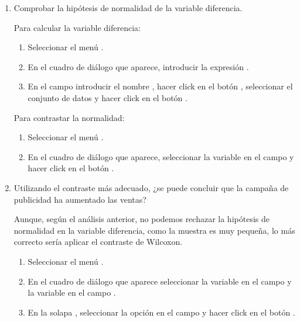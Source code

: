 \begin{enumerate}[leftmargin=*]
\begin{enumerate}
\item Comprobar la hipótesis de normalidad de la variable diferencia.
\begin{indicacion}
Para calcular la variable diferencia:
\begin{enumerate}
\item Seleccionar el menú .
\item En el cuadro de diálogo que aparece, introducir la expresión .
\item En el campo  introducir el nombre , hacer click en el botón
, seleccionar el conjunto de datos  y hacer click en el botón .
\end{enumerate}
Para contrastar la normalidad:
\begin{enumerate}
\item Seleccionar el menú .
\item En el cuadro de diálogo que aparece, seleccionar la variable  en el campo  y
hacer click en el botón .
\end{enumerate}
\end{indicacion}

\item Utilizando el contraste más adecuado, ¿se puede concluir que la campaña de publicidad ha aumentado las ventas?
\begin{indicacion}
Aunque, según el análisis anterior, no podemos rechazar la hipótesis de normalidad en la variable diferencia, como la
muestra es muy pequeña, lo más correcto sería aplicar el contraste de Wilcoxon.
\begin{enumerate}
\item Seleccionar el menú .
\item En el cuadro de diálogo que aparece seleccionar la variable  en el campo  y la variable
 en el campo .
\item En la solapa , seleccionar la opción  en el campo  y hacer click en el botón .
\end{enumerate}
\end{indicacion}
\end{enumerate}



\end{enumerate}
